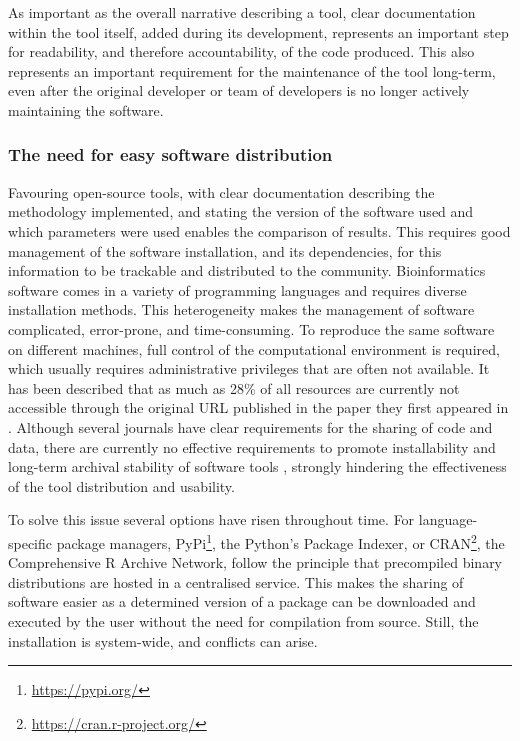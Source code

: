 As important as the overall narrative describing a tool, clear documentation within the tool itself, added during its development, represents an important step for readability, and therefore accountability, of the code produced. This also represents an important requirement for the maintenance of the tool long-term, even after the original developer or team of developers is no longer actively maintaining the software. 

\subsubsection{The need for easy software distribution}

Favouring open-source tools, with clear documentation describing the methodology implemented, and stating the version of the software used and which parameters were used enables the comparison of results. This requires good management of the software installation, and its dependencies, for this information to be trackable and distributed to the community. Bioinformatics software comes in a variety of programming languages and requires diverse installation methods. This heterogeneity makes the management of software complicated, error-prone, and time-consuming. To reproduce the same software on different machines, full control of the computational environment is required, which usually requires administrative privileges that are often not available.  It has been described that as much as 28\% of all resources are currently not accessible through the original \ac{URL} published in the paper they first appeared in \citep{mangul_challenges_2019}. Although several journals have clear requirements for the sharing of code and data, there are currently no effective requirements to promote installability and long-term archival stability of software tools \citep{mangul_challenges_2019}, strongly hindering the effectiveness of the tool distribution and usability. 

To solve this issue several options have risen throughout time. For language-specific package managers, PyPi\footnote{\url{https://pypi.org/}}, the Python's Package Indexer, or CRAN\footnote{\url{https://cran.r-project.org/}}, the Comprehensive R Archive Network, follow the principle that precompiled binary distributions are hosted in a centralised service. This makes the sharing of software easier as a determined version of a package can be downloaded and executed by the user without the need for compilation from source. Still, the installation is system-wide, and conflicts can arise. 

